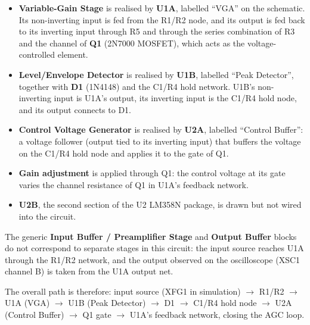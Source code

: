 \begin{itemize}
    \item \textbf{Variable-Gain Stage} is realised by \textbf{U1A}, labelled ``VGA'' on the schematic. Its non-inverting input is fed from the R1/R2 node, and its output is fed back to its inverting input through R5 and through the series combination of R3 and the channel of \textbf{Q1} (2N7000 MOSFET), which acts as the voltage-controlled element.
    \item \textbf{Level/Envelope Detector} is realised by \textbf{U1B}, labelled ``Peak Detector'', together with \textbf{D1} (1N4148) and the C1/R4 hold network. U1B's non-inverting input is U1A's output, its inverting input is the C1/R4 hold node, and its output connects to D1.
    \item \textbf{Control Voltage Generator} is realised by \textbf{U2A}, labelled ``Control Buffer'': a voltage follower (output tied to its inverting input) that buffers the voltage on the C1/R4 hold node and applies it to the gate of Q1.
    \item \textbf{Gain adjustment} is applied through Q1: the control voltage at its gate varies the channel resistance of Q1 in U1A's feedback network.
    \item \textbf{U2B}, the second section of the U2 LM358N package, is drawn but not wired into the circuit.
\end{itemize}

The generic \textbf{Input Buffer / Preamplifier Stage} and \textbf{Output Buffer} blocks do not correspond to separate stages in this circuit: the input source reaches U1A through the R1/R2 network, and the output observed on the oscilloscope (XSC1 channel B) is taken from the U1A output net.

The overall path is therefore: input source (XFG1 in simulation) $\rightarrow$ R1/R2 $\rightarrow$ U1A (VGA) $\rightarrow$ U1B (Peak Detector) $\rightarrow$ D1 $\rightarrow$ C1/R4 hold node $\rightarrow$ U2A (Control Buffer) $\rightarrow$ Q1 gate $\rightarrow$ U1A's feedback network, closing the AGC loop.

